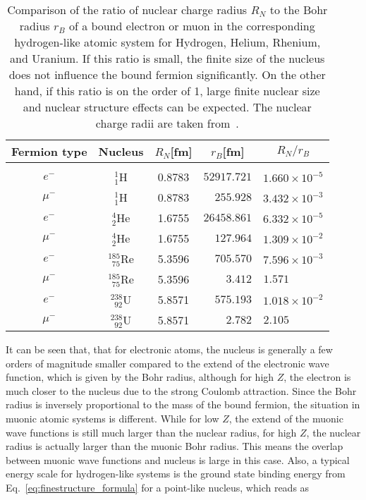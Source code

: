 \begin{table}
\caption{\label{tab:nucl_radii}
Comparison of the ratio of nuclear charge radius $R_N$ to the Bohr radius $r_B$ of a bound electron or muon in the corresponding hydrogen-like atomic system for Hydrogen, Helium, Rhenium, and Uranium. If this ratio is small, the finite size of the nucleus does not influence the bound fermion significantly. On the other hand, if this ratio is on the order of 1, large finite nuclear size and nuclear structure effects can be expected. The nuclear charge radii are taken from~\cite{Angeli2013}.}
\centering
\begin{tabular}{ccccc}
Fermion type & Nucleus & $R_N$[fm]&$r_B$[fm]&$R_N/r_B$\\\hline\\[-5pt]
$e^-$&$^1_1$H&0.8783&$52917.721$&$1.660\times 10^{-5}$\\[3pt]
$\mu^-$&$^1_1$H&0.8783&$\phantom{11}255.928$&$3.432\times 10^{-3}$\\[15pt]
$e^-$&$^4_2$He&1.6755&$26458.861$&$6.332\times 10^{-5}$\\[3pt]
$\mu^-$&$^4_2$He&1.6755&$\phantom{11}127.964$&$1.309\times 10^{-2}$\\[15pt]
$e^-$&$^{185}_{\phantom{1}75}$Re&5.3596&$\phantom{11}705.570$&$7.596\times 10^{-3}$\\[3pt]
$\mu^-$&$^{185}_{\phantom{1}75}$Re&5.3596&$\phantom{1111}3.412$&$1.571\phantom{111111}$\\[15pt]
$e^-$&$^{238}_{\phantom{1}92}$U&5.8571&$\phantom{11}575.193$&$1.018\times 10^{-2}$\\[3pt]
$\mu^-$&$^{238}_{\phantom{1}92}$U&5.8571&$\phantom{1111}2.782$&$2.105\phantom{111111}$
\end{tabular}
\end{table}
%
%
It can be seen that, that for electronic atoms, the nucleus is generally a few orders of magnitude smaller compared to the extend of the electronic wave function, which is given by the Bohr radius, although for high $Z$, the electron is much closer to the nucleus due to the strong Coulomb attraction. Since the Bohr radius is inversely proportional to the mass of the bound fermion, the situation in muonic atomic systems is different. While for low $Z$, the extend of the muonic wave functions is still much larger than the nuclear radius, for high $Z$, the nuclear radius is actually larger than the muonic Bohr radius. This means the overlap between muonic wave functions and nucleus is large in this case. Also, a typical energy scale for hydrogen-like systems is the ground state binding energy from Eq.~\eqref{eq:finestructure_formula} for a point-like nucleus, which reads as
